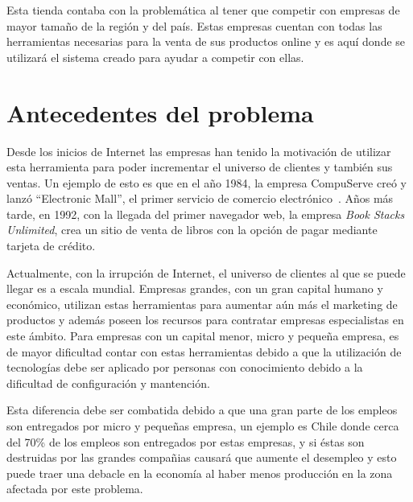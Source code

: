 Esta tienda contaba con la problemática al tener que competir con empresas de mayor 
tamaño de la región y del país. Estas empresas cuentan con todas las herramientas
necesarias para la venta de sus productos online y es aquí donde se utilizará 
el sistema creado para ayudar a competir con ellas. 

\section{Antecedentes del problema}

Desde los inicios de Internet las empresas han tenido la motivación de utilizar
esta herramienta para poder incrementar el universo de clientes y también sus
ventas.
Un ejemplo de esto es que en el año 1984, la empresa CompuServe creó y lanzó
``Electronic Mall'', el primer servicio de comercio electrónico~\cite{Def:1}.
Años más tarde, en 1992, con la llegada del primer navegador web, la empresa
\emph{Book Stacks Unlimited}, crea un sitio de venta de libros con la opción de
pagar mediante tarjeta de crédito.

Actualmente, con la irrupción de Internet, el universo de clientes al que se
puede llegar es a escala mundial.
Empresas grandes, con un gran capital humano y económico, utilizan estas
herramientas para aumentar aún más el marketing de productos y además poseen los
recursos para contratar empresas especialistas en este ámbito.
Para empresas con un capital menor, micro y pequeña empresa, es de mayor
dificultad contar con estas herramientas debido a que la utilización de 
tecnologías debe ser aplicado por personas con conocimiento debido a la dificultad
de configuración y mantención.

Esta diferencia debe ser combatida debido a que una gran parte de los empleos
son entregados por micro y pequeñas empresa, un ejemplo es Chile donde cerca del
70\% de los empleos son entregados por estas empresas, y si éstas son destruidas
por las grandes compañias causará que aumente el desempleo y esto puede traer una
debacle en la economía al haber menos producción en la zona afectada por este
problema.


